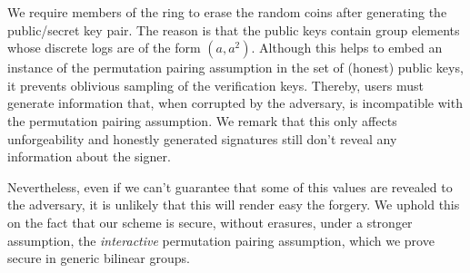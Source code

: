 

We require members of the ring to erase the random coins after generating the public/secret key pair. The reason is that the public keys contain group elements whose discrete logs are of the form $(a,a^2)$. Although this helps to embed an instance of the permutation pairing assumption in the set of (honest) public keys, it prevents oblivious sampling of the verification keys. Thereby, users must generate information that, when corrupted by the adversary, is incompatible with the permutation pairing assumption. We remark that this only affects unforgeability and honestly generated signatures still don't reveal any information about the signer.

Nevertheless, even if we can't guarantee that some of this values are revealed to the adversary, it is unlikely that this will render easy the forgery. We uphold this on the fact that our scheme is secure, without erasures, under a stronger assumption, the \emph{interactive} permutation pairing assumption, which we prove secure in generic bilinear groups.
%
